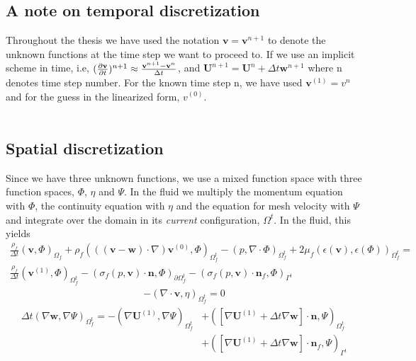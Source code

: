 \subsection{A note on temporal discretization}
Throughout the thesis we have used the notation $\mathbf{v} = \mathbf{v}^{n+1}$ to denote the unknown functions at the time step we want to proceed to.  
If we use an implicit scheme in time, i.e, $(\frac{\partial \mathbf{v}}{\partial t})^{n+1} \approx \frac{\mathbf{v}^{n+1}-\mathbf{v}^{n}}{\Delta t} $, and $\mathbf{U}^{n+1} = \mathbf{U}^{n} + \Delta t \mathbf{w}^{n+1}$ where n denotes time step number. For the known time step n, we have used $\mathbf{v}^{(1)} = v^n$ and for the guess in the linearized form, $v^{(0)}$.
\\
\\
\subsection{Spatial discretization}
Since we have three unknown functions, we use a mixed function space with three function spaces, $\Phi$, $\eta$ and $\Psi$. In the fluid we multiply the momentum equation with $\Phi$, the continuity equation with $\eta$ and the equation for mesh velocity with $\Psi$ and integrate over the domain in its \textit{current} configuration, $\Omega^t$. In the fluid, this yields
\begin{align}
\frac{\rho_f}{\Delta t}(\mathbf{v},\Phi)_{\Omega_f} + \rho_f(((\mathbf{v}-\mathbf{w})\cdot \nabla) \mathbf{v}^{(0)}, \Phi)_{\Omega_f^t} - (p,\nabla \cdot \Phi)_{\Omega_f^t} + 2\mu_f(\epsilon(\mathbf{v}), \epsilon(\Phi))_{\Omega_f^t} = \\ 
\frac{\rho_f}{\Delta t}(\mathbf{v}^{(1)},\Phi)_{\Omega_f^t} - (\sigma_f(p,\mathbf{v})\cdot \mathbf{n}, \Phi)_{\partial \Omega_f^t} - (\sigma_f(p,\mathbf{v}) \cdot \mathbf{n}_f, \Phi)_{\Gamma^t} \label{VarMom}
\end{align}
\begin{align}
-(\nabla \cdot \mathbf{v},\eta)_{\Omega_f^t} = 0 \label{VarCon}
\end{align}
\begin{align}
\Delta t(\nabla \mathbf{w}, \nabla \Psi)_{\Omega_f^t} = - (\nabla \mathbf{U}^{(1)}, \nabla \Psi)_{\Omega_f^t} & + ([\nabla \mathbf{U}^{(1)} + \Delta t \nabla \mathbf{w}] \cdot \mathbf{n}, \Psi)_{\Omega_f^t} \\ 
& + ([\nabla \mathbf{U}^{(1)} + \Delta t \nabla \mathbf{w}] \cdot \mathbf{n}_f, \Psi)_{\Gamma^t} \label{VarMesh}
\end{align}
